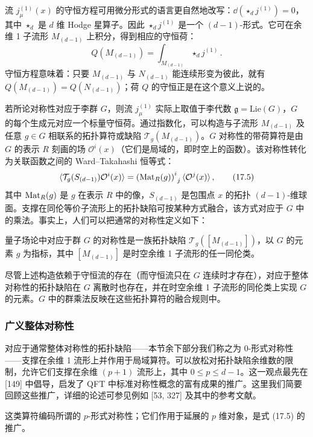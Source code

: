 流 $j^{(1)}_\mu(x)$ 的守恒方程可用微分形式的语言更自然地改写：$\dd(\star_d j^{(1)})=0$，其中 $\star_d$ 是 $d$ 维 Hodge 星算子。因此 $\star_d j^{(1)}$ 是一个 $(d-1)$-形式。它可在余维 1 子流形 $M_{(d-1)}$ 上积分，得到相应的守恒荷：
\[
Q(M_{(d-1)})=\int_{M_{(d-1)}}\star_d j^{(1)}\,.
\]
守恒方程意味着：只要 $M_{(d-1)}$ 与 $N_{(d-1)}$ 能连续形变为彼此，就有 $Q(M_{(d-1)})=Q(N_{(d-1)})$；荷 $Q$ 的守恒正是在这个意义上说的。

若所论对称性对应于李群 $G$，则流 $j^{(1)}_\mu$ 实际上取值于李代数 $\mathfrak{g}=\mathrm{Lie}(G)$，$G$ 的每个生成元对应一个标量守恒荷。通过指数化，可以构造与子流形 $M_{(d-1)}$ 及任意 $g\in G$ 相联系的拓扑算符或缺陷 $\mathcal{T}_g(M_{(d-1)})$。$G$ 对称性的带荷算符是由 $G$ 的表示 $R$ 刻画的场 $\mathcal{O}^i(x)$（它们是局域的，即时空上的函数）。该对称性转化为关联函数之间的 Ward–Takahashi 恒等式：
\begin{equation}
\langle\mathcal{T}_g(S_{(d-1)})\mathcal{O}^i(x)\rangle=\left(\Mat_R(g)\right)^i_{\ j}\langle\mathcal{O}^j(x)\rangle\,,
\tag{17.5}
\end{equation}
其中 $\operatorname{Mat}_R(g)$ 是 $g$ 在表示 $R$ 中的像，$S_{(d-1)}$ 是包围点 $x$ 的拓扑 $(d-1)$-维球面。支撑在同伦等价子流形上的拓扑缺陷可按某种方式融合，该方式对应于 $G$ 中的乘法。事实上，人们可以把通常的对称性定义如下：

\begin{definition}[17.10] 量子场论中对应于群 $G$ 的对称性是一族拓扑缺陷 $\mathcal{T}_g([M_{(d-1)}])$，以 $G$ 的元素 $g$ 为指标，其中 $[M_{(d-1)}]$ 是时空余维 1 子流形的任一同伦类。\end{definition}

尽管上述构造依赖于守恒流的存在（而守恒流只在 $G$ 连续时才存在），对应于整体对称性的拓扑缺陷在 $G$ 离散时也存在，并在时空余维 1 子流形的同伦类上实现 $G$ 的元素。$G$ 中的群乘法反映在这些拓扑算符的融合规则中。

\subsubsection*{广义整体对称性}

对应于通常整体对称性的拓扑缺陷——本节余下部分我们称之为 0-形式对称性——支撑在余维 1 流形上并作用于局域算符。可以放松对拓扑缺陷余维数的限制，允许它们支撑在余维 $(p+1)$ 流形上，其中 $0\le p\le d-1$。这一观点最先在 [149] 中倡导，启发了 QFT 中标准对称性概念的富有成果的推广。这里我们简要回顾这些推广，详细的论述可参见例如 [53, 327] 及其中的参考文献。

\begin{definition}[17.11] 这类算符编码所谓的 $p$-形式对称性；它们作用于延展的 $p$ 维对象，是式 (17.5) 的推广。\end{definition}

